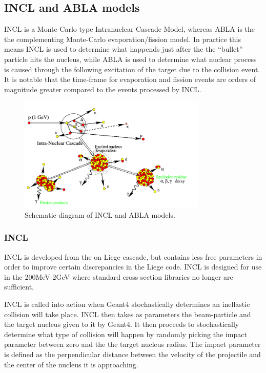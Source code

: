 \subsection{INCL and ABLA models} %



INCL is a Monte-Carlo type Intranuclear Cascade Model, whereas ABLA is the the complementing Monte-Carlo evaporation/fission model. In practice this means INCL is used to determine what happends just after the the ``bullet'' particle hits the nucleus, while ABLA is used to determine what nuclear process is caused through the following excitation of the target due to the collision event. It is notable that the time-frame for evaporation and fission events are orders of magnitude greater compared to the events processed by INCL.


\begin{figure} 
\begin{center}
\includegraphics[width=0.8\textwidth]{images/inclScematic.png}  
\caption{\label{fig:inclschematic} Schematic diagram of INCL and ABLA models.}
 
 \end{center}
 \end{figure}


\subsubsection{INCL}

INCL is developed from the on Liege cascade, but contains less free parameters in order to improve certain discrepancies in the Liege code. INCL is designed for use in the 200MeV-2GeV where standard cross-section libraries no longer are sufficient.

INCL is called into action when Geant4 stochastically determines an inellastic collision will take place. INCL then takes as parameters the beam-particle and the target nucleus given to it by Geant4. It then proceeds to stochastically determine what type of collision will happen by randomly picking the impact parameter between zero and the the target nucleus radius. The impact parameter is defined as the perpendicular distance between the velocity of the projectile and the center of the nucleus it is approaching.

